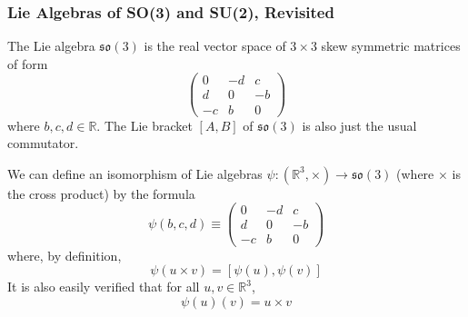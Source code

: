   \subsubsection{Lie Algebras of SO(3) and SU(2), Revisited}

    \begin{example}
      The Lie algebra $\mathfrak{so}(3)$ is the real vector space of $3 \times 3$ skew symmetric matrices of form 
      \begin{equation}
        \begin{pmatrix}
        0 & -d & c \\ d & 0 & -b \\ -c & b & 0
        \end{pmatrix}
      \end{equation}
      where $b, c, d \in \mathbb{R}$. The Lie bracket $[A,B]$ of $\mathfrak{so}(3)$ is also just the usual commutator. 

      We can define an isomorphism of Lie algebras $\psi: (\mathbb{R}^3, \times) \rightarrow \mathfrak{so}(3)$ (where $\times$ is the cross product) by the formula 
      \begin{equation}
        \psi(b, c, d) \equiv \begin{pmatrix}
        0 & -d & c \\
        d & 0 & -b \\
        -c & b & 0
        \end{pmatrix}
      \end{equation}
      where, by definition, 
      \begin{equation}
        \psi(u \times v) = [\psi(u), \psi(v)]
      \end{equation}
      It is also easily verified that for all $u, v \in \mathbb{R}^3$, 
      \begin{equation}
        \psi(u) (v) = u \times v
      \end{equation}
    \end{example}

